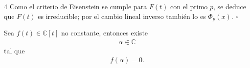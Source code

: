 \documentclass[landscape,a4paper]{article}
\begin{document}
\begin{multicols}{4}
Como el criterio de Eisenstein se cumple para $F(t)$ con el primo $p$, se deduce que $F(t)$ es irreducible; por el cambio lineal inverso también lo es $\Phi_p(x)$.  \hfill$\square$

\begin{tcolorbox}[colback=white,colframe=red!80!black,colbacktitle=red!80!black,
                  coltitle=white,title={Teorema Fundamental del Álgebra}]
Sea $f(t)\in\mathbb{C}[t]$ no constante, entonces existe \begin{align*} \alpha\in\mathbb{C} \end{align*} tal que \begin{align*} f(\alpha)=0. \end{align*}
\end{tcolorbox}


\end{multicols}
\end{document}
